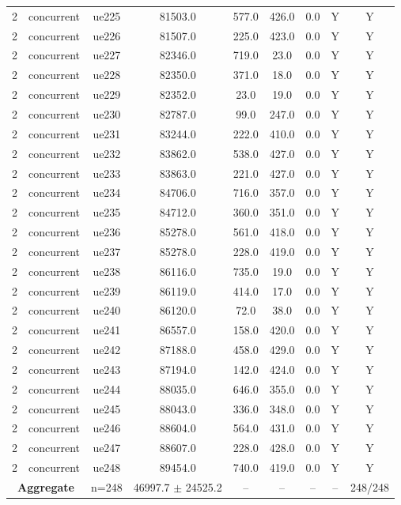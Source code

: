 \begin{table}[ht]
\begin{tabular}{|c|c|c|c|c|c|c|c|c|}
2 & concurrent & ue225 & 81503.0 & 577.0 & 426.0 & 0.0 & Y & Y \\
2 & concurrent & ue226 & 81507.0 & 225.0 & 423.0 & 0.0 & Y & Y \\
2 & concurrent & ue227 & 82346.0 & 719.0 & 23.0 & 0.0 & Y & Y \\
2 & concurrent & ue228 & 82350.0 & 371.0 & 18.0 & 0.0 & Y & Y \\
2 & concurrent & ue229 & 82352.0 & 23.0 & 19.0 & 0.0 & Y & Y \\
2 & concurrent & ue230 & 82787.0 & 99.0 & 247.0 & 0.0 & Y & Y \\
2 & concurrent & ue231 & 83244.0 & 222.0 & 410.0 & 0.0 & Y & Y \\
2 & concurrent & ue232 & 83862.0 & 538.0 & 427.0 & 0.0 & Y & Y \\
2 & concurrent & ue233 & 83863.0 & 221.0 & 427.0 & 0.0 & Y & Y \\
2 & concurrent & ue234 & 84706.0 & 716.0 & 357.0 & 0.0 & Y & Y \\
2 & concurrent & ue235 & 84712.0 & 360.0 & 351.0 & 0.0 & Y & Y \\
2 & concurrent & ue236 & 85278.0 & 561.0 & 418.0 & 0.0 & Y & Y \\
2 & concurrent & ue237 & 85278.0 & 228.0 & 419.0 & 0.0 & Y & Y \\
2 & concurrent & ue238 & 86116.0 & 735.0 & 19.0 & 0.0 & Y & Y \\
2 & concurrent & ue239 & 86119.0 & 414.0 & 17.0 & 0.0 & Y & Y \\
2 & concurrent & ue240 & 86120.0 & 72.0 & 38.0 & 0.0 & Y & Y \\
2 & concurrent & ue241 & 86557.0 & 158.0 & 420.0 & 0.0 & Y & Y \\
2 & concurrent & ue242 & 87188.0 & 458.0 & 429.0 & 0.0 & Y & Y \\
2 & concurrent & ue243 & 87194.0 & 142.0 & 424.0 & 0.0 & Y & Y \\
2 & concurrent & ue244 & 88035.0 & 646.0 & 355.0 & 0.0 & Y & Y \\
2 & concurrent & ue245 & 88043.0 & 336.0 & 348.0 & 0.0 & Y & Y \\
2 & concurrent & ue246 & 88604.0 & 564.0 & 431.0 & 0.0 & Y & Y \\
2 & concurrent & ue247 & 88607.0 & 228.0 & 428.0 & 0.0 & Y & Y \\
2 & concurrent & ue248 & 89454.0 & 740.0 & 419.0 & 0.0 & Y & Y \\
\multicolumn{2}{|c|}{\textbf{Aggregate}} & n=248 & 46997.7 $\pm$ 24525.2 & -- & -- & -- & -- & 248/248 \\

\end{tabular}
\end{table}
